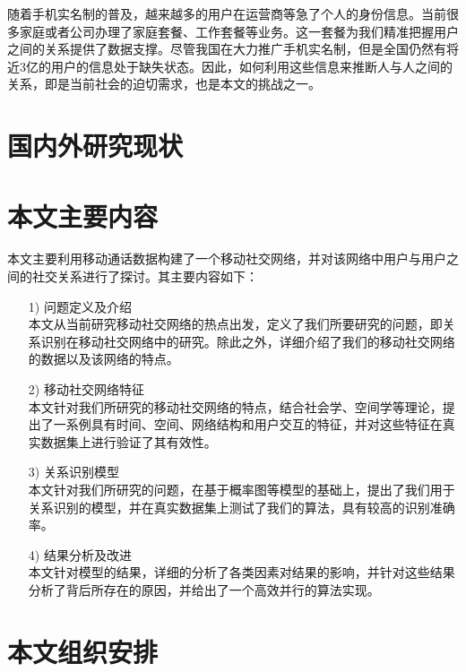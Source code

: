 随着手机实名制的普及，越来越多的用户在运营商等急了个人的身份信息。当前很多家庭或者公司办理了家庭套餐、工作套餐等业务。这一套餐为我们精准把握用户之间的关系提供了数据支撑。尽管我国在大力推广手机实名制，但是全国仍然有将近3亿的用户的信息处于缺失状态。因此，如何利用这些信息来推断人与人之间的关系，即是当前社会的迫切需求，也是本文的挑战之一。


\section{国内外研究现状}







\section{本文主要内容}

本文主要利用移动通话数据构建了一个移动社交网络，并对该网络中用户与用户之间的社交关系进行了探讨。其主要内容如下：

\begin{enumerate}
\item[1)]问题定义及介绍 \\
本文从当前研究移动社交网络的热点出发，定义了我们所要研究的问题，即关系识别在移动社交网络中的研究。除此之外，详细介绍了我们的移动社交网络的数据以及该网络的特点。

\item[2)] 移动社交网络特征 \\
本文针对我们所研究的移动社交网络的特点，结合社会学、空间学等理论，提出了一系例具有时间、空间、网络结构和用户交互的特征，并对这些特征在真实数据集上进行验证了其有效性。

\item[3)] 关系识别模型 \\
本文针对我们所研究的问题，在基于概率图等模型的基础上，提出了我们用于关系识别的模型，并在真实数据集上测试了我们的算法，具有较高的识别准确率。

\item[4)] 结果分析及改进 \\
本文针对模型的结果，详细的分析了各类因素对结果的影响，并针对这些结果分析了背后所存在的原因，并给出了一个高效并行的算法实现。
\end{enumerate}



\section{本文组织安排}

